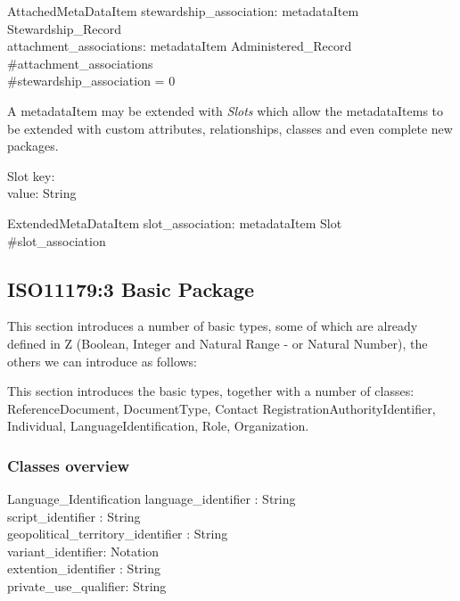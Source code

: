 \documentclass{llncs}
\begin{document}
\begin{schema}{AttachedMetaDataItem}
stewardship\_association: metadataItem \pfun Stewardship\_Record \\
attachment\_associations: metadataItem \pfun Administered\_Record \\
\where
 \#attachment\_associations  \\
 \#stewardship\_association = 0 \\
\end{schema}


A metadataItem may be extended with \emph{Slots} which allow the metadataItems to be extended with custom attributes, relationships, classes and even complete new packages.
\begin{zed}
[String]
\end{zed}
\begin{schema}{Slot}
  key: \nat \\
  value: String \\
\end{schema}

\begin{schema}{ExtendedMetaDataItem}
	slot\_association: metadataItem \pfun Slot \\
\where
 	\#slot\_association  \\
\end{schema}

  

\subsection{ISO11179:3 Basic Package}

This section introduces a number of basic types, some of which are already defined in Z (Boolean, Integer and Natural Range - or Natural Number), the others we can introduce as follows:
\begin{zed}
\end{zed}
This section introduces the basic types, together with a number of classes: ReferenceDocument, DocumentType, Contact RegistrationAuthorityIdentifier, Individual, LanguageIdentification, Role, Organization.


\subsubsection{Classes overview}

\begin{class}{Language\_Identification}
\also
language\_identifier : String \\
script\_identifier : String \\
geopolitical\_territory\_identifier : String \\
variant\_identifier: Notation \\
extention\_identifier : String\\
private\_use\_qualifier: String\\
\end{class}
\end{document}
